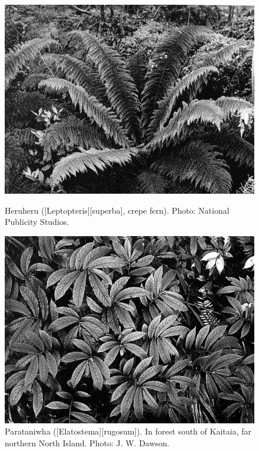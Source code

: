 \begin{figure}[!b]
	\begin{minipage}[t]{\textwidth}
		\begin{minipage}[t]{(\textwidth-\fgap) * \real{0.497}}
			\centering
			\includegraphics[width=\textwidth]{graphics/figure62crepefern.jpg}
			\caption[Heruheru (\emph{Leptopteris superba}, crepe fern)]{Heruheru ([Leptopteris][superba], crepe fern).
			Photo: National Publicity Studios.}%
			\label{fig:62crepefern}
		\end{minipage}\hspace{\fgap}%
		\begin{minipage}[t]{(\textwidth-\fgap) * \real{0.503}}
			\centering
			\includegraphics[width=\textwidth]{graphics/figure63parataniwha.jpg}
			\caption[Parataniwha]{Parataniwha ([Elatostema][rugosum]).
			In forest south of Kaitaia, far northern North Island.
			Photo: J. W. Dawson.}%
			\label{fig:63parataniwha}
		\end{minipage}
	\end{minipage}
\end{figure}

